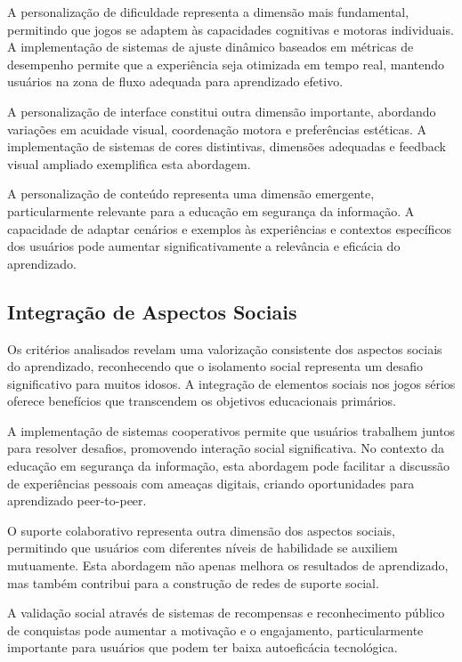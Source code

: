 \begin{table}[H]
A personalização de dificuldade representa a dimensão mais fundamental, permitindo que jogos se adaptem às capacidades cognitivas e motoras individuais. A implementação de sistemas de ajuste dinâmico baseados em métricas de desempenho permite que a experiência seja otimizada em tempo real, mantendo usuários na zona de fluxo adequada para aprendizado efetivo.

A personalização de interface constitui outra dimensão importante, abordando variações em acuidade visual, coordenação motora e preferências estéticas. A implementação de sistemas de cores distintivas, dimensões adequadas e feedback visual ampliado exemplifica esta abordagem.

A personalização de conteúdo representa uma dimensão emergente, particularmente relevante para a educação em segurança da informação. A capacidade de adaptar cenários e exemplos às experiências e contextos específicos dos usuários pode aumentar significativamente a relevância e eficácia do aprendizado.

\subsection{Integração de Aspectos Sociais}
\label{subsec:aspectos_sociais}

Os critérios analisados revelam uma valorização consistente dos aspectos sociais do aprendizado, reconhecendo que o isolamento social representa um desafio significativo para muitos idosos. A integração de elementos sociais nos jogos sérios oferece benefícios que transcendem os objetivos educacionais primários.

A implementação de sistemas cooperativos permite que usuários trabalhem juntos para resolver desafios, promovendo interação social significativa. No contexto da educação em segurança da informação, esta abordagem pode facilitar a discussão de experiências pessoais com ameaças digitais, criando oportunidades para aprendizado peer-to-peer.

O suporte colaborativo representa outra dimensão dos aspectos sociais, permitindo que usuários com diferentes níveis de habilidade se auxiliem mutuamente. Esta abordagem não apenas melhora os resultados de aprendizado, mas também contribui para a construção de redes de suporte social.

A validação social através de sistemas de recompensas e reconhecimento público de conquistas pode aumentar a motivação e o engajamento, particularmente importante para usuários que podem ter baixa autoeficácia tecnológica.


\end{table}
